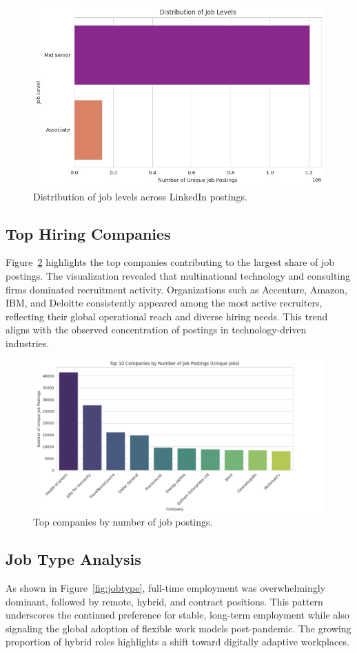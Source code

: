 \documentclass[conference]{IEEEtran}
\begin{document}
\begin{figure}[htbp]
\centering
    \includegraphics[width=0.5\linewidth]{joblevels.jpeg}
\caption{Distribution of job levels across LinkedIn postings.}
\label{fig:joblevel}
\end{figure}


\subsection{Top Hiring Companies}
Figure~\ref{fig:companies} highlights the top companies contributing to the largest share of job postings. The visualization revealed that multinational technology and consulting firms dominated recruitment activity. Organizations such as Accenture, Amazon, IBM, and Deloitte consistently appeared among the most active recruiters, reflecting their global operational reach and diverse hiring needs. This trend aligns with the observed concentration of postings in technology-driven industries.

\begin{figure}[htbp]
 \centering
    \includegraphics[width=0.5\linewidth]{job_type_distribution.png}
    
\caption{Top companies by number of job postings.}
\label{fig:companies}
\end{figure}


\subsection{Job Type Analysis}
As shown in Figure~\ref{fig:jobtype}, full-time employment was overwhelmingly dominant, followed by remote, hybrid, and contract positions. This pattern underscores the continued preference for stable, long-term employment while also signaling the global adoption of flexible work models post-pandemic. The growing proportion of hybrid roles highlights a shift toward digitally adaptive workplaces.
\end{document}
